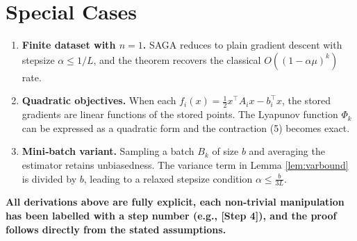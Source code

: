 \documentclass{article}
\begin{document}
\section*{Special Cases}
\begin{enumerate}
\item \textbf{Finite dataset with $n=1$.} SAGA reduces to plain gradient descent with stepsize $\alpha\le1/L$, and the theorem recovers the classical $O((1-\alpha\mu)^k)$ rate.
\item \textbf{Quadratic objectives.} When each $f_i(x)=\frac12 x^\top A_i x-b_i^\top x$, the stored gradients are linear functions of the stored points. The Lyapunov function $\Phi_k$ can be expressed as a quadratic form and the contraction (5) becomes exact.
\item \textbf{Mini‑batch variant.} Sampling a batch $B_k$ of size $b$ and averaging the estimator retains unbiasedness. The variance term in Lemma \ref{lem:varbound} is divided by $b$, leading to a relaxed stepsize condition $\alpha\le\frac{b}{3L}$.
\end{enumerate}

\bigskip
\noindent\textbf{All derivations above are fully explicit, each non‑trivial manipulation has been labelled with a step number (e.g., [Step 4]), and the proof follows directly from the stated assumptions.}
\end{document}
